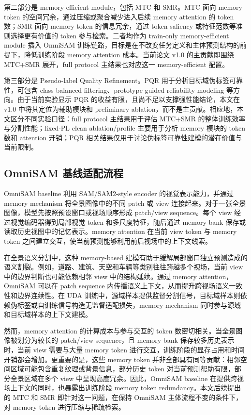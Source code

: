 第二部分是 memory-efficient module，包括 MTC 和 SMR。MTC 面向 memory token 的空间冗余，通过压缩或聚合减少进入后续 memory attention 的 token 数；SMR 面向 memory token 的信息冗余，通过 token saliency 或特征范数等准则选择更有价值的 token 参与检索。二者均作为 train-only memory-efficient module 插入 OmniSAM 训练链路，目标是在不改变任务定义和主体预测结构的前提下，降低训练阶段 memory attention 成本。当前论文 v1.0 的主贡献即围绕 MTC+SMR 展开，full protocol 主结果也对应这一 memory-efficient 配置。

第三部分是 Pseudo-label Quality Refinement。PQR 用于分析目标域伪标签可靠性，可包含 class-balanced filtering、prototype-guided reliability modeling 等方向。由于当前实验显示 PQR 的收益有限，且尚不足以支撑强性能结论，本文在 v1.0 中将其定位为辅助模块和 preliminary ablation，而不是主贡献。相应地，本文区分不同实验口径：full protocol 主结果用于评估 MTC+SMR 的整体训练效率与分割性能；fixed-PL clean ablation/profile 主要用于分析 memory 模块的 token 数和 attention 开销；PQR 相关结果仅用于讨论伪标签可靠性建模的潜在价值与当前限制。

\subsection{OmniSAM 基线适配流程}
OmniSAM baseline 利用 SAM/SAM2-style encoder 的视觉表示能力，并通过 memory mechanism 将全景图像中的不同 patch 或 view 连接起来。对于一张全景图像，模型先按照预设窗口或视场顺序形成 patch/view sequence。每个 view 经过视觉编码器得到局部视觉 token 和多尺度特征，随后通过 memory bank 保存或读取历史视图中的记忆表示。memory attention 在当前 view token 与 memory token 之间建立交互，使当前预测能够利用前后视场中的上下文线索。

在全景语义分割中，这种 memory-based 建模有助于缓解局部窗口独立预测造成的语义割裂。例如，道路、建筑、天空和车辆等类别往往跨越多个视场，当前 view 中的边界判断也可能依赖相邻 view 中的结构延续。通过 memory attention，OmniSAM 可以在 patch sequence 内传播语义上下文，从而提升跨视场语义一致性和边界连续性。在 UDA 训练中，源域样本提供监督分割信号，目标域样本则依赖伪标签或自训练信号构造无监督适配损失，memory mechanism 同时参与源域和目标域样本的上下文建模。

然而，memory attention 的计算成本与参与交互的 token 数密切相关。当全景图像被划分为较长的 patch/view sequence，且 memory bank 保存较多历史表示时，当前 view 需要与大量 memory token 进行交互，训练阶段的显存占用和时间开销都会增加。更重要的是，这些 memory token 并非全部具有同等贡献：相邻空间区域可能包含重复纹理或背景信息，部分历史 token 对当前预测帮助有限，部分全景区域在多个 view 中呈现高度冗余。因此，OmniSAM baseline 在提供跨视场上下文的同时，也暴露出训练阶段 memory token redundancy。本文后续提出的 MTC 和 SMR 即针对这一问题，在保持 OmniSAM 主体流程不变的条件下，对 memory token 进行压缩与稀疏检索。


